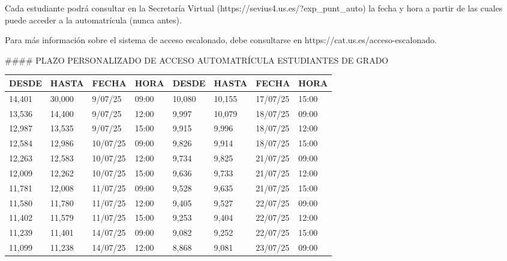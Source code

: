 \documentclass{article}
\begin{document}
\begin{itemize}
\begin{itemize}
\begin{scriptsize}
                  Cada estudiante podrá consultar en la Secretaría Virtual (https://sevius4.us.es/?exp\_punt\_auto) la fecha y hora a partir de las cuales puede acceder a la automatrícula (nunca antes).

                  Para más información sobre el sistema de acceso escalonado, debe consultarse en https://cat.us.es/acceso-escalonado.

                  \#\#\#\# PLAZO PERSONALIZADO DE ACCESO AUTOMATRÍCULA ESTUDIANTES DE GRADO

                  \vspace{0.4cm}
                  \begin{table}[h!]\centering\renewcommand{\arraystretch}{1.3}
                    \begin{tabular}{|p{}|p{}|p{}|p{}|p{}|p{}|p{}|p{}|}\hline
                      DESDE  & HASTA  & FECHA    & HORA  & DESDE  & HASTA  & FECHA    & HORA  \\\hline
                      14,401 & 30,000 & 9/07/25  & 09:00 & 10,080 & 10,155 & 17/07/25 & 15:00 \\\hline
                      13,536 & 14,400 & 9/07/25  & 12:00 & 9,997  & 10,079 & 18/07/25 & 09:00 \\\hline
                      12,987 & 13,535 & 9/07/25  & 15:00 & 9,915  & 9,996  & 18/07/25 & 12:00 \\\hline
                      12,584 & 12,986 & 10/07/25 & 09:00 & 9,826  & 9,914  & 18/07/25 & 15:00 \\\hline
                      12,263 & 12,583 & 10/07/25 & 12:00 & 9,734  & 9,825  & 21/07/25 & 09:00 \\\hline
                      12,009 & 12,262 & 10/07/25 & 15:00 & 9,636  & 9,733  & 21/07/25 & 12:00 \\\hline
                      11,781 & 12,008 & 11/07/25 & 09:00 & 9,528  & 9,635  & 21/07/25 & 15:00 \\\hline
                      11,580 & 11,780 & 11/07/25 & 12:00 & 9,405  & 9,527  & 22/07/25 & 09:00 \\\hline
                      11,402 & 11,579 & 11/07/25 & 15:00 & 9,253  & 9,404  & 22/07/25 & 12:00 \\\hline
                      11,239 & 11,401 & 14/07/25 & 09:00 & 9,082  & 9,252  & 22/07/25 & 15:00 \\\hline
                      11,099 & 11,238 & 14/07/25 & 12:00 & 8,868  & 9,081  & 23/07/25 & 09:00 \\\hline

\end{tabular}
\end{table}
\end{scriptsize}
\end{itemize}
\end{itemize}
\end{document}

